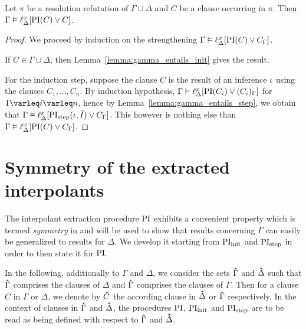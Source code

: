 \begin{lemma}
	\label{lemma:gamma_entails_lifted_interpolant}
	Let $\pi$ be a resolution refutation of $\Gamma \cup \Delta$ and $C$ be a clause occurring in $\pi$.
	Then $\Gamma \entails \lifdelta{\PI(C) \lor\nolinebreak C}$.
\end{lemma}
\begin{proof}
	We proceed by induction on the strengthening
	$\Gamma \entails \lifdelta{\PI(C) \lor\nolinebreak C_\Gamma}$.

	If $C \in \Gamma\cup\Delta$, then Lemma~\ref{lemma:gamma_entails_init} gives the result.

	For the induction step, suppose the clause $C$ is the result of an inference $\iota$ using the clauses $C_1, \dots, C_n$.
	By induction hypothesis, $\Gamma \entails \lifdelta{\PI(C_i) \lor\nolinebreak (C_i)_\Gamma}$ for $1\varleq i\varleq n$, hence
	by Lemma~\ref{lemma:gamma_entails_step}, we obtain that 
	$\Gamma \vDash \ell_{\Delta}^{x}[\operatorname{PI}_{\mathrm{step}}(\iota, \bar I) \lor C_\Gamma]$.
	This however is nothing else than $\Gamma \vDash \ell_{\Delta}^{x}[\operatorname{PI}(C) \lor C_\Gamma]$.
\end{proof}




\section{Symmetry of the extracted interpolants}
\label{sec:symmetry}

The interpolant extraction procedure $\operatorname{PI}$ exhibits a convenient property which is termed \emph{symmetry} in \cite[Definition 3]{interpolantStrenth} and will be used to show that results concerning $\Gamma$ can easily be generalized to results for $\Delta$.
We develop it starting from $\operatorname{PI}_{\mathrm{init}}$ and $\operatorname{PI}_{\mathrm{step}}$ in order to then state it for $\operatorname{PI}$. 

\newcommand{\primex}[1]{\ensuremath{\bhat{#1}}}

In the following, additionally to $\Gamma$ and $\Delta$, we consider the sets $\primex{\Gamma}$ and $\primex{\Delta}$ such that $\primex{\Gamma}$ comprises the clauses of $\Delta$ and $\primex{\Gamma}$ comprises the clauses of $\Gamma$. 
Then for a clause $C$ in $\Gamma$ or $\Delta$, we denote by $\primex C$ the according clause in $\primex \Delta$ or $\primex \Gamma$ respectively.
In the context of clauses in $\primex \Gamma$ and $\primex \Delta$, the procedures $\operatorname{PI}$, $\operatorname{PI}_{\mathrm{init}}$ and $\operatorname{PI}_{\mathrm{step}}$ are to be read as being defined with respect to $\primex \Gamma$ and $\primex \Delta$.




